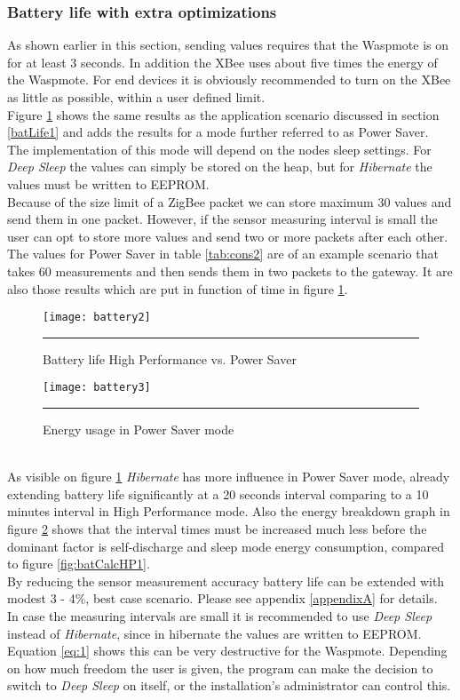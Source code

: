 \subsubsection{Battery life with extra optimizations}
As shown earlier in this section, sending values requires that the Waspmote is on for at least 3 seconds. In addition the XBee uses about five times the energy of the Waspmote. For end devices it is obviously recommended to turn on the XBee as little as possible, within a user defined limit.\\ Figure \ref{fig:batCalcPS} shows the same results as the application scenario discussed in section \ref{batLife1} and adds the results for a mode further referred to as Power Saver.\\
The implementation of this mode will depend on the nodes sleep settings. For \textit{Deep Sleep} the values can simply be stored on the heap, but for \textit{Hibernate} the values must be written to EEPROM.\\
Because of the size limit of a ZigBee packet we can store maximum 30 values and send them in one packet. However, if the sensor measuring interval is small the user can opt to store more values and send two or more packets after each other. The values for Power Saver in table \ref{tab:cons2} are of an example scenario that takes 60 measurements and then sends them in two packets to the gateway. It are also those results which are put in function of time in figure \ref{fig:batCalcPS}.  
\begin{figure}[htbp]
\centering
\texttt{[image: battery2]}
\rule{30em}{0.5pt}
\caption{Battery life High Performance vs. Power Saver}
\label{fig:batCalcPS}
\end{figure}
\begin{figure}[htbp]
\centering
\texttt{[image: battery3]}
\rule{30em}{0.5pt}
\caption{Energy usage in Power Saver mode}
\label{fig:batCalcPS1}
\end{figure}\\
As visible on figure \ref{fig:batCalcPS} \textit{Hibernate} has more influence in Power Saver mode, already extending battery life significantly at a 20 seconds interval comparing to a 10 minutes interval in High Performance mode. Also the energy breakdown graph in figure \ref{fig:batCalcPS1} shows that the interval times must be increased much less before the dominant factor is self-discharge and sleep mode energy consumption, compared to figure \ref{fig:batCalcHP1}.\\By reducing the sensor measurement accuracy battery life can be extended with modest 3 - 4\%, best case scenario. Please see appendix \ref{appendixA} for details.\\
In case the measuring intervals are small it is recommended to use \textit{Deep Sleep} instead of \textit{Hibernate}, since in hibernate the values are written to EEPROM. Equation \ref{eq:1} shows this can be very destructive for the Waspmote. Depending on how much freedom the user is given, the program can make the decision to switch to \textit{Deep Sleep} on itself, or the installation's administrator can control this.

